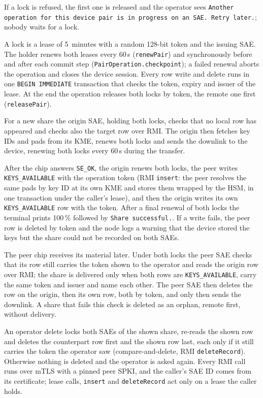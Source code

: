 \documentclass[11pt,a4paper]{article}
\begin{document}
If a lock is refused,
the first one is released and the operator sees \texttt{Another operation for
this device pair is in progress on an SAE. Retry later.}; nobody waits for a
lock. 

A lock is a lease of 5~minutes with a random 128-bit token and the
issuing SAE. The holder renews both leases every 60\,s (\texttt{renewPair})
and synchronously before and after each commit step
(\texttt{PairOperation.\allowbreak checkpoint}); a failed renewal aborts the
operation and closes the device session. Every row write and delete runs in
one \texttt{BEGIN IMMEDIATE} transaction that checks the token, expiry and
issuer of the lease. At the end the operation releases both locks by token,
the remote one first (\texttt{releasePair}).

For a new share the origin SAE, holding both locks, checks that no local row
has appeared and checks also the target row over RMI. The origin then fetches key IDs and pads
from its KME, renews both locks and sends the downlink to the device, renewing
both locks every 60\,s during the transfer. 

After the chip answers
\texttt{SE\_OK}, the origin renews both locks, the peer writes
\texttt{KEYS\_AVAILABLE} with the operation token (RMI
\texttt{insert}: the peer resolves the same pads by key ID at its own KME and
stores them wrapped by the HSM, in one transaction under the caller's lease),
and then the origin writes its own \texttt{KEYS\_\allowbreak AVAILABLE} row
with the token. After a final renewal of both locks the terminal prints
100\,\% followed by \texttt{Share successful.}. If a write
fails, the peer row is deleted by token and the node logs a warning that the
device stored the keys but the share could not be recorded on both SAEs.

The peer chip receives its material later. Under both locks the peer SAE
checks that its row still carries the token shown to the operator and reads
the origin row over RMI; the share is delivered only when both rows are
\texttt{KEYS\_\allowbreak AVAILABLE}, carry the same token and issuer and name
each other. The peer SAE then deletes the row on the origin, then its own row,
both by token, and only then sends the downlink. A share that fails this check
is deleted as an orphan, remote first, without delivery.

An operator delete locks both SAEs of the shown share, re-reads the shown row
and deletes the counterpart row first and the shown row last, each only if it
still carries the token the operator saw (compare-and-delete, RMI
\texttt{deleteRecord}). Otherwise nothing is deleted and the operator is asked
again. Every RMI call runs over mTLS with a pinned peer SPKI, and the caller's
SAE ID comes from its certificate; lease calls, \texttt{insert} and
\texttt{deleteRecord} act only on a lease the caller holds.
\end{document}
